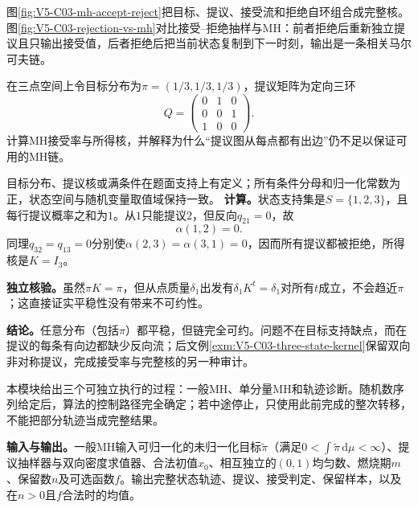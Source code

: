 \label{struct:V5-C03-CH17}
图\ref{fig:V5-C03-mh-accept-reject}把目标、提议、接受流和拒绝自环组合成完整核。图\ref{fig:V5-C03-rejection-vs-mh}对比接受--拒绝抽样与MH：前者拒绝后重新独立提议且只输出接受值，后者拒绝后把当前状态复制到下一时刻，输出是一条相关马尔可夫链。


\label{struct:V5-C03-CH18}
\begin{example}[单向提议造成的支持连通缺口]\label{exm:V5-C03-asymmetric-proposal}
在三点空间上令目标分布为$\pi=(1/3,1/3,1/3)$，提议矩阵为定向三环
\[
Q=\begin{pmatrix}
0&1&0\\
0&0&1\\
1&0&0
\end{pmatrix}.
\]
计算MH接受率与所得核，并解释为什么“提议图从每点都有出边”仍不足以保证可用的MH链。
\end{example}

\begin{solution}
\SolGiven 目标分布、提议核或满条件在题面支持上有定义；所有条件分母和归一化常数为正，状态空间与随机变量取值域保持一致。
\SolDerive
\textbf{计算。}状态支持集是$S=\{1,2,3\}$，且每行提议概率之和为$1$。从$1$只能提议$2$，但反向$q_{21}=0$，故
\[
\alpha(1,2)=0.
\]
同理$q_{32}=q_{13}=0$分别使$\alpha(2,3)=\alpha(3,1)=0$，因而所有提议都被拒绝，所得核是$K=I_3$。

\textbf{独立核验。}虽然$\pi K=\pi$，但从点质量$\delta_1$出发有$\delta_1K^t=\delta_1$对所有$t$成立，不会趋近$\pi$；这直接证实平稳性没有带来不可约性。

\textbf{结论。}任意分布（包括$\pi$）都平稳，但链完全可约。问题不在目标支持缺点，而在提议的每条有向边都缺少反向流；后文例\ref{exm:V5-C03-three-state-kernel}保留双向非对称提议，完成接受率与完整核的另一种审计。
\end{solution}

\label{struct:V5-C03-CH19}
本模块给出三个可独立执行的过程：一般MH、单分量MH和轨迹诊断。随机数序列给定后，算法的控制路径完全确定；若中途停止，只使用此前完成的整次转移，不能把部分轨迹当成完整结果。

\label{struct:V5-C03-CH20}
\textbf{输入与输出。}一般MH输入可归一化的未归一化目标$\widetilde\pi$（满足$0<\int\widetilde\pi\,\mathrm d\mu<\infty$）、提议抽样器与双向密度求值器、合法初值$x_0$、相互独立的$(0,1)$均匀数、燃烧期$m$、保留数$n$及可选函数$f$。输出完整状态轨迹、提议、接受判定、保留样本，以及在$n>0$且$f$合法时的均值。


